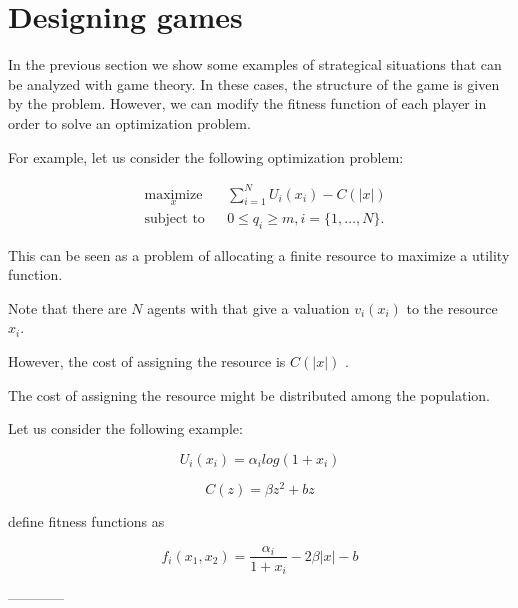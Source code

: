 \documentclass[a4paper,10pt]{article}
\begin{document}
\iffalse

\section{Designing games}

In the previous section we show some examples of strategical situations that can be analyzed with game theory. In these cases, the structure of the game is given by the problem. However, we can modify the fitness function of each player in order to solve an optimization problem.

For example, let us consider the following optimization problem:

\begin{equation}\label{eq:opt_problem}
\begin{aligned}
& \underset{x}{\text{maximize}} 
& & \sum_{i=1}^N U_i(x_i)  - C(|x|)\\
& \text{subject to}
& & 0 \leq q_i \geq m,  i =\{1,\ldots, N\}.
\end{aligned}
\end{equation}

This can be seen as a problem of allocating a finite resource to maximize a utility function. 

Note that there are $N$ agents with that give a valuation $v_i(x_i)$ to the resource $x_i$.

However, the cost of assigning the resource is $C(|x|)$ .

The cost of assigning the resource might be distributed among the population. 

Let us consider the following example:


\begin{equation}
U_i(x_i) =   \alpha_i  log(1+x_i) 
\end{equation}

\begin{equation}
C(z) = \beta z^2 + b z 
\end{equation}

define fitness functions as 

\begin{equation}
f_i(x_1, x_2) = \frac{\alpha_i}{1+x_i} - 2 \beta |x| - b 
\end{equation}










------------
\end{document}
